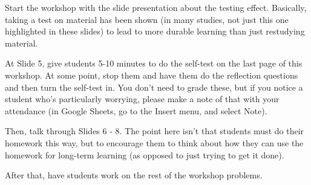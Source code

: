 \documentclass{article}
\begin{document}

\begin{workshop}
  Start the workshop with the slide presentation about the testing effect. Basically, taking a test on material has been shown (in many studies, not just this one highlighted in these slides) to lead to more durable learning than just restudying material.

  At Slide 5, give students 5-10 minutes to do the self-test on the last page of this workshop. At some point, stop them and have them do the reflection questions and then turn the self-test in. You don't need to grade these, but if you notice a student who's particularly worrying, please make a note of that with your attendance (in Google Sheets, go to the Insert menu, and select Note).

  Then, talk through Slides 6 - 8. The point here isn't that students must do their homework this way, but to encourage them to think about how they can use the homework for long-term learning (as opposed to just trying to get it done). 

  After that, have students work on the rest of the workshop problems.
\end{workshop}
\end{document}
